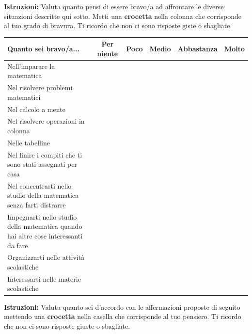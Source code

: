 \documentclass[11pt]{article}
\begin{document}
\newpage

\noindent\textbf{Istruzioni:} Valuta quanto pensi di essere bravo/a ad affrontare le diverse situazioni descritte qui sotto. Metti una \textbf{crocetta} nella colonna che corrisponde al tuo grado di bravura. Ti ricordo che non ci sono risposte giste o sbagliate. 
\newline

\noindent\begin{tabular}{|p{7cm}|c|c|c|c|c|}
  \hline
  \textbf{Quanto sei bravo/a...} & \textbf{Per niente} & \textbf{Poco} & \textbf{Medio} & \textbf{Abbastanza} & \textbf{Molto} \\
  \hline
  Nell'imparare la matematica & & & & & \\
  \hline
  Nel risolvere problemi matematici & & & & & \\
  \hline
  Nel calcolo a mente & & & & & \\
  \hline
  Nel risolvere operazioni in colonna & & & & & \\
  \hline
  Nelle tabelline & & & & & \\
  \hline
  Nel finire i compiti che ti sono stati assegnati per casa & & & & & \\
  \hline 
  Nel concentrarti nello studio della matematica senza farti distrarre & & & & & \\
  \hline
  Impegnarti nello studio della matematica quando hai altre cose interessanti da fare & & & & & \\
  \hline
  Organizzarti nelle attività scolastiche & & & & & \\
  \hline
  Interessarti nelle materie scolastiche & & & & & \\
  \hline
\end{tabular}

\newpage
\noindent\textbf{Istruzioni:} Valuta quanto sei d'accordo con le affermazioni proposte di seguito mettendo una \textbf{crocetta} nella casella che corrisponde al tuo pensiero. Ti ricordo che non ci sono risposte giuste o sbagliate. 
\newline
\end{document}
